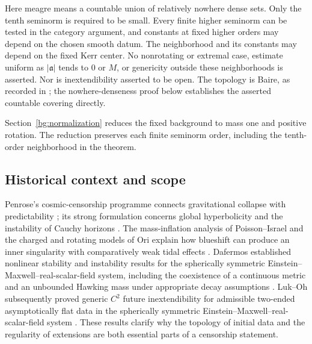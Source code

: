 Here meagre means a countable union of relatively nowhere dense sets.
Only the tenth seminorm is required to be small. Every finite higher
seminorm can be tested in the category argument, and constants at
fixed higher orders may depend on the chosen smooth datum.
The neighborhood and its constants may depend on the fixed Kerr center.
No nonrotating or extremal case, estimate uniform as $|\mathfrak a|$ tends
to $0$ or $M$, or genericity outside these neighborhoods is asserted.
Nor is inextendibility asserted to be open.
The topology is Baire, as recorded in
\cite[]{KerrCOne}; the nowhere-denseness proof below establishes
the asserted countable covering directly.

Section~\ref{bg:normalization} reduces the fixed background to mass one
and positive rotation. The reduction preserves each finite seminorm
order, including the tenth-order neighborhood in the theorem.

\subsection{Historical context and scope}

Penrose's cosmic-censorship programme connects gravitational collapse
with predictability \cite{Penrose1969}; its strong formulation concerns
global hyperbolicity and the instability of Cauchy horizons
\cite[Section~12.3.2]{Penrose1979}.
The mass-inflation analysis of Poisson--Israel and the charged and
rotating models of Ori explain how blueshift can produce an inner
singularity with comparatively weak tidal effects
\cite{PoissonIsrael1990,Ori1991,Ori1992}.
Dafermos established nonlinear stability and instability results for
the spherically symmetric Einstein--Maxwell--real-scalar-field system,
including the coexistence of a continuous metric and an unbounded
Hawking mass under appropriate decay assumptions
\cite{Dafermos2003,Dafermos2005}. Luk--Oh subsequently proved generic
$C^2$ future inextendibility for admissible two-ended asymptotically flat data in
the spherically symmetric Einstein--Maxwell--real-scalar-field system
\cite{LukOh2019I,LukOh2019II}. These results clarify why the topology
of initial data and the regularity of extensions are both essential
parts of a censorship statement.

